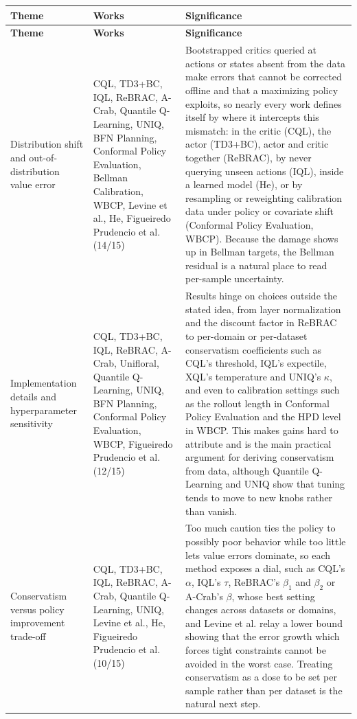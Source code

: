 \documentclass[11pt]{article}
\begin{document}
{\small
\begin{longtable}{P{3.4cm} P{3.6cm} P{8.2cm}}
\toprule
\textbf{Theme} & \textbf{Works} & \textbf{Significance} \\
\midrule
\endfirsthead
\toprule
\textbf{Theme} & \textbf{Works} & \textbf{Significance} \\
\midrule
\endhead
Distribution shift and out-of-distribution value error & CQL, TD3+BC, IQL, ReBRAC, A-Crab, Quantile Q-Learning, UNIQ, BFN Planning, Conformal Policy Evaluation, Bellman Calibration, WBCP, Levine et al., He, Figueiredo Prudencio et al. (14/15) & Bootstrapped critics queried at actions or states absent from the data make errors that cannot be corrected offline and that a maximizing policy exploits, so nearly every work defines itself by where it intercepts this mismatch: in the critic (CQL), the actor (TD3+BC), actor and critic together (ReBRAC), by never querying unseen actions (IQL), inside a learned model (He), or by resampling or reweighting calibration data under policy or covariate shift (Conformal Policy Evaluation, WBCP). Because the damage shows up in Bellman targets, the Bellman residual is a natural place to read per-sample uncertainty. \\
\addlinespace
Implementation details and hyperparameter sensitivity & CQL, TD3+BC, IQL, ReBRAC, A-Crab, Unifloral, Quantile Q-Learning, UNIQ, BFN Planning, Conformal Policy Evaluation, WBCP, Figueiredo Prudencio et al. (12/15) & Results hinge on choices outside the stated idea, from layer normalization and the discount factor in ReBRAC to per-domain or per-dataset conservatism coefficients such as CQL's threshold, IQL's expectile, XQL's temperature and UNIQ's \ensuremath{\kappa}, and even to calibration settings such as the rollout length in Conformal Policy Evaluation and the HPD level in WBCP. This makes gains hard to attribute and is the main practical argument for deriving conservatism from data, although Quantile Q-Learning and UNIQ show that tuning tends to move to new knobs rather than vanish. \\
\addlinespace
Conservatism versus policy improvement trade-off & CQL, TD3+BC, IQL, ReBRAC, A-Crab, Quantile Q-Learning, UNIQ, Levine et al., He, Figueiredo Prudencio et al. (10/15) & Too much caution ties the policy to possibly poor behavior while too little lets value errors dominate, so each method exposes a dial, such as CQL's \ensuremath{\alpha}, IQL's \ensuremath{\tau}, ReBRAC's $\beta_{1}$ and $\beta_{2}$ or A-Crab's \ensuremath{\beta}, whose best setting changes across datasets or domains, and Levine et al. relay a lower bound showing that the error growth which forces tight constraints cannot be avoided in the worst case. Treating conservatism as a dose to be set per sample rather than per dataset is the natural next step. \\

\end{longtable}}
\end{document}
